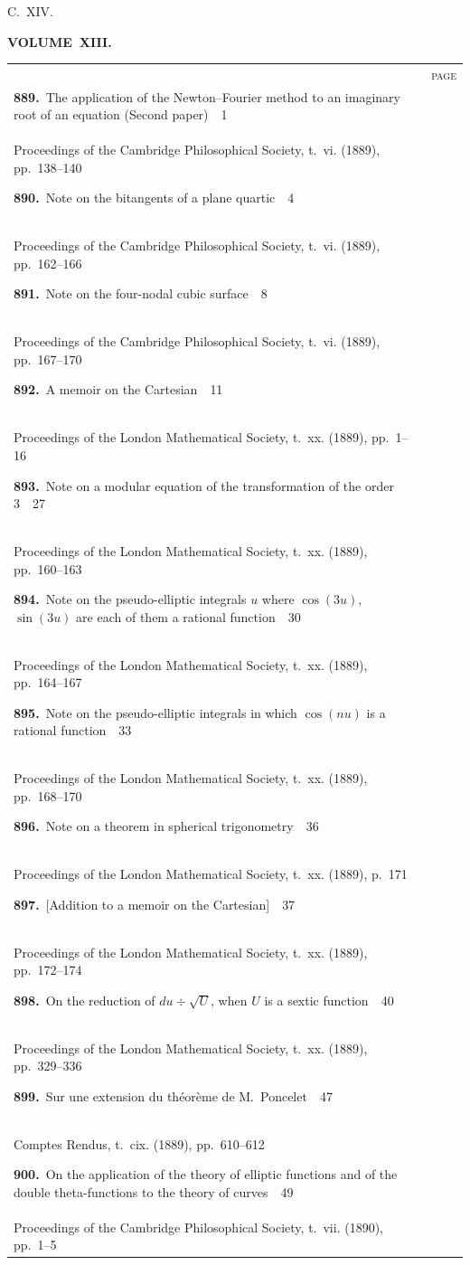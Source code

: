 \documentclass[11pt,a4paper]{book}
\newcommand{\paperentry}[4]{%
  \noindent\textbf{#1.}\ {#2}\ \dotfill\ {#3}\\[-0.2em]%
  {\small #4}\par\vspace{0.6em}%
}
\begin{document}
\newpage
\thispagestyle{empty}
\fancyhead[C]{}
\noindent\hfill{\large C.~XIV.}\hfill\null\vspace{0.5em}

\begin{center}
{\Large\bfseries VOLUME~XIII.}
\end{center}
\vspace{0.5em}

\begin{center}
\begin{tabular}{p{4.2in}r}
& \textsc{page} \\
\paperentry{889}{The application of the Newton--Fourier method to an imaginary root of an equation (Second paper)}{1}{Proceedings of the Cambridge Philosophical Society, t.~vi. (1889), pp.~138--140}
\paperentry{890}{Note on the bitangents of a plane quartic}{4}{Proceedings of the Cambridge Philosophical Society, t.~vi. (1889), pp.~162--166}
\paperentry{891}{Note on the four-nodal cubic surface}{8}{Proceedings of the Cambridge Philosophical Society, t.~vi. (1889), pp.~167--170}
\paperentry{892}{A memoir on the Cartesian}{11}{Proceedings of the London Mathematical Society, t.~xx. (1889), pp.~1--16}
\paperentry{893}{Note on a modular equation of the transformation of the order 3}{27}{Proceedings of the London Mathematical Society, t.~xx. (1889), pp.~160--163}
\paperentry{894}{Note on the pseudo-elliptic integrals $u$ where $\cos(3u)$, $\sin(3u)$ are each of them a rational function}{30}{Proceedings of the London Mathematical Society, t.~xx. (1889), pp.~164--167}
\paperentry{895}{Note on the pseudo-elliptic integrals in which $\cos(nu)$ is a rational function}{33}{Proceedings of the London Mathematical Society, t.~xx. (1889), pp.~168--170}
\paperentry{896}{Note on a theorem in spherical trigonometry}{36}{Proceedings of the London Mathematical Society, t.~xx. (1889), p.~171}
\paperentry{897}{[Addition to a memoir on the Cartesian]}{37}{Proceedings of the London Mathematical Society, t.~xx. (1889), pp.~172--174}
\paperentry{898}{On the reduction of $du \div \sqrt{U}$, when $U$ is a sextic function}{40}{Proceedings of the London Mathematical Society, t.~xx. (1889), pp.~329--336}
\paperentry{899}{Sur une extension du th\'{e}or\`{e}me de M.~Poncelet}{47}{Comptes Rendus, t.~cix. (1889), pp.~610--612}
\paperentry{900}{On the application of the theory of elliptic functions and of the double theta-functions to the theory of curves}{49}{Proceedings of the Cambridge Philosophical Society, t.~vii. (1890), pp.~1--5}

\end{tabular}
\end{center}
\end{document}
